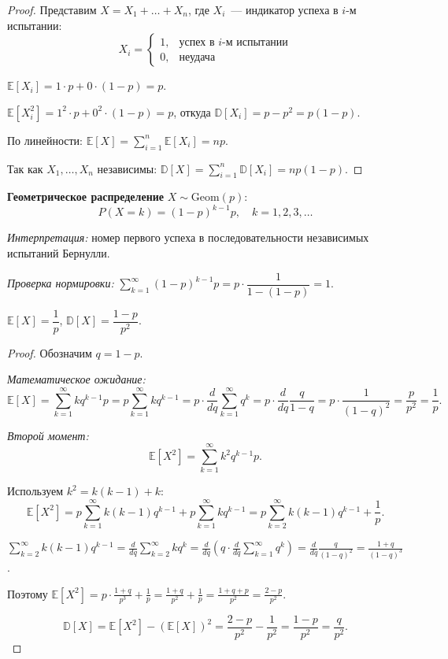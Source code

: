 \documentclass[12pt]{article}
\begin{document}
	\begin{proof}
		Представим $X = X_1 + \dots + X_n$, где $X_i$~--- индикатор успеха в $i$-м испытании:
		\[X_i = \begin{cases} 1, & \text{успех в } i\text{-м испытании} \\ 0, & \text{неудача} \end{cases}\]
		
		$\mathbb{E}[X_i] = 1 \cdot p + 0 \cdot (1-p) = p$.
		
		$\mathbb{E}[X_i^2] = 1^2 \cdot p + 0^2 \cdot (1-p) = p$, откуда $\mathbb{D}[X_i] = p - p^2 = p(1-p)$.
		
		По линейности: $\mathbb{E}[X] = \sum_{i=1}^n \mathbb{E}[X_i] = np$.
		
		Так как $X_1, \dots, X_n$ независимы: $\mathbb{D}[X] = \sum_{i=1}^n \mathbb{D}[X_i] = np(1-p)$.
	\end{proof}
	
	\textbf{Геометрическое распределение} $X \sim \text{Geom}(p)$:
	\[P(X = k) = (1-p)^{k-1} p, \quad k = 1, 2, 3, \dots\]
	
	\textit{Интерпретация:} номер первого успеха в последовательности независимых испытаний Бернулли.
	
	\textit{Проверка нормировки:} $\sum_{k=1}^{\infty} (1-p)^{k-1} p = p \cdot \dfrac{1}{1-(1-p)} = 1$.
	
	\begin{theorem}
		$\mathbb{E}[X] = \dfrac{1}{p}$, $\mathbb{D}[X] = \dfrac{1-p}{p^2}$.
	\end{theorem}
	
	\begin{proof}
		Обозначим $q = 1 - p$.
		
		\textit{Математическое ожидание:}
		\[\mathbb{E}[X] = \sum_{k=1}^{\infty} k q^{k-1} p = p \sum_{k=1}^{\infty} k q^{k-1} = p \cdot \frac{d}{dq}\sum_{k=1}^{\infty} q^k = p \cdot \frac{d}{dq} \frac{q}{1-q} = p \cdot \frac{1}{(1-q)^2} = \frac{p}{p^2} = \frac{1}{p}.\]
		
		\textit{Второй момент:}
		\[\mathbb{E}[X^2] = \sum_{k=1}^{\infty} k^2 q^{k-1} p.\]
		
		Используем $k^2 = k(k-1) + k$:
		\[\mathbb{E}[X^2] = p\sum_{k=1}^{\infty} k(k-1) q^{k-1} + p\sum_{k=1}^{\infty} k q^{k-1} = p \sum_{k=2}^{\infty} k(k-1) q^{k-1} + \frac{1}{p}.\]
		
		$\sum_{k=2}^{\infty} k(k-1) q^{k-1} = \frac{d}{dq}\sum_{k=2}^{\infty} k q^k = \frac{d}{dq}\left(q \cdot \frac{d}{dq}\sum_{k=1}^{\infty} q^k\right) = \frac{d}{dq}\frac{q}{(1-q)^2} = \frac{1+q}{(1-q)^3}$.
		
		Поэтому $\mathbb{E}[X^2] = p \cdot \frac{1+q}{p^3} + \frac{1}{p} = \frac{1+q}{p^2} + \frac{1}{p} = \frac{1+q+p}{p^2} = \frac{2-p}{p^2}$.
		
		\[\mathbb{D}[X] = \mathbb{E}[X^2] - (\mathbb{E}[X])^2 = \frac{2-p}{p^2} - \frac{1}{p^2} = \frac{1-p}{p^2} = \frac{q}{p^2}.\]
	\end{proof}
	
\end{document}
